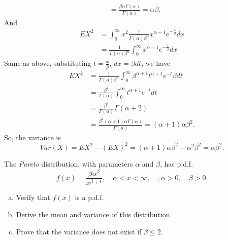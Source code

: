 \documentclass[14pt]{elegantbook}
\begin{document}
\begin{solution}
\begin{enumerate}[(a)]
\begin{align*}
                &=\frac{\beta\alpha\Gamma(\alpha)}{\Gamma(\alpha)}=\alpha\beta. 
            \end{align*}
            And 
            \begin{align*}
                EX^2&=\int_0^\infty x^2\frac{1}{\Gamma(\alpha )\beta ^{\alpha }}x^{\alpha -1}e^{-\frac{x}{\beta }}dx\\
                &=\frac{1}{\Gamma(\alpha )\beta ^{\alpha }}\int_0^\infty x^{\alpha +1}e^{-\frac{x}{\beta }}dx
            \end{align*}
            Same as above, substituting $t=\frac{x}{\beta}$, $dx=\beta dt$, we have
            \begin{align*}
                EX^2&=\frac{1}{\Gamma(\alpha )\beta ^{\alpha }}\int_0^\infty \beta^{\alpha +1}t^{\alpha +1}e^{-t}\beta dt\\
                &=\frac{\beta^2}{\Gamma(\alpha )}\int_0^\infty t^{\alpha +1}e^{-t}dt\\
                &=\frac{\beta^2}{\Gamma(\alpha )}\Gamma(\alpha+2)\\
                &=\frac{\beta^2(\alpha+1)\alpha\Gamma(\alpha)}{\Gamma(\alpha)}=(\alpha+1)\alpha\beta^2. 
            \end{align*}
            So, the variance is
            \[
                Var(X)=EX^2-(EX)^2=(\alpha+1)\alpha\beta^2-\alpha^2\beta^2=\alpha\beta^2.
            \]
        \end{enumerate}
    \end{solution}
    
    \begin{exercise}
        The \emph{Pareto} distribution, with parameters $\alpha$ and $\beta$, has p.d.f.
        \[
            f(x)=\frac{\beta\alpha^\beta}{x^{\beta+1}}, \quad \alpha<x<\infty, \quad, \alpha>0,\quad \beta>0. 
        \]
        \begin{enumerate}[(a)]
            \item Verify that $f(x)$ is a p.d.f. 
            \item Derive the mean and variance of this distribution.
            \item Prove that the variance does not exist if $\beta\leq2$. 
        \end{enumerate}
    \end{exercise}
\end{document}
